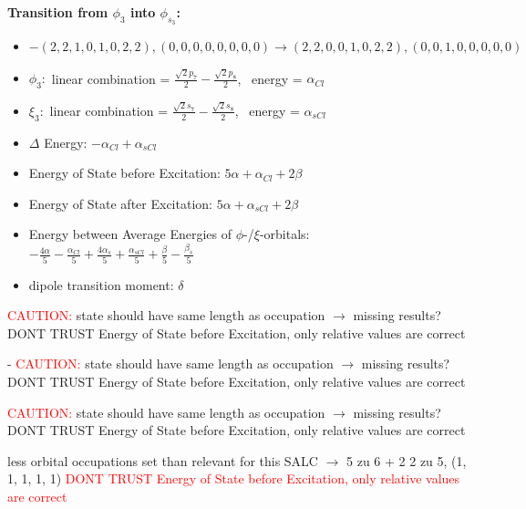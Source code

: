 \documentclass[12pt,a4paper]{article}
\begin{document}
        \noindent\textbf{Transition from $\phi_{3}$ into $\phi_{s_{3}}$:}
        \begin{itemize}
            \item $- (2, 2, 1, 0, 1, 0, 2, 2), (0, 0, 0, 0, 0, 0, 0, 0) \rightarrow (2, 2, 0, 0, 1, 0, 2, 2), (0, 0, 1, 0, 0, 0, 0, 0)$
        
            \item $\phi_{3}:$ linear combination = $\frac{\sqrt{2} p_{7}}{2} - \frac{\sqrt{2} p_{8}}{2}$, \
            energy = $\alpha_{Cl}$
            
            \item $\xi_{3}:$ linear combination = $\frac{\sqrt{2} s_{7}}{2} - \frac{\sqrt{2} s_{8}}{2}$, \
            energy = $\alpha_{s Cl}$
            
            \item $\Delta$ Energy: $- \alpha_{Cl} + \alpha_{s Cl}$
            \item Energy of State before Excitation: $5 \alpha + \alpha_{Cl} + 2 \beta$
            \item Energy of State after Excitation: $5 \alpha + \alpha_{s Cl} + 2 \beta$
            \item Energy between Average Energies of $\phi$-/$\xi$-orbitals: \
            $- \frac{4 \alpha}{5} - \frac{\alpha_{Cl}}{5} + \frac{4 \alpha_{s}}{5} + \frac{\alpha_{s Cl}}{5} + \frac{\beta}{5} - \frac{\beta_{s}}{5}$
        
            \item dipole transition moment: $\delta$
        
        \end{itemize}
        
	\textcolor{red}{CAUTION:} state should have same length as occupation $\rightarrow$ missing results?
	DONT TRUST \glqq{}Energy of State before Excitation\grqq{}, only relative values are correct

 - 	\textcolor{red}{CAUTION:} state should have same length as occupation $\rightarrow$ missing results?
	DONT TRUST \glqq{}Energy of State before Excitation\grqq{}, only relative values are correct

	\textcolor{red}{CAUTION:} state should have same length as occupation $\rightarrow$ missing results?
	DONT TRUST \glqq{}Energy of State before Excitation\grqq{}, only relative values are correct

less orbital occupations set than relevant for this SALC $\rightarrow$ 
5 zu 6 + 2 
2 zu 5, (1, 1, 1, 1, 1) 
\textcolor{red}{DONT TRUST \glqq{}Energy of State before Excitation\grqq{}, only relative values are correct}
\end{document}
